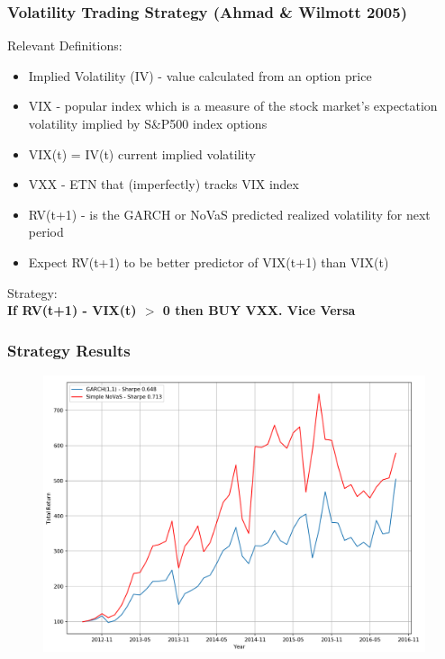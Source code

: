 \documentclass{beamer}
\begin{document}
\begin{frame}
\frametitle{Volatility Trading Strategy (Ahmad \& Wilmott 2005)}
\vspace{-2pt}
Relevant Definitions:
\begin{itemize}
\item{Implied Volatility (IV) - value calculated from an option price}
\vspace{2pt}
\item{VIX - popular index which is a measure of the stock market's expectation volatility implied by S\&P500 index options}
\vspace{2pt}
\item{VIX(t) = IV(t) current implied volatility}
\vspace{2pt}
\item{VXX - ETN that (imperfectly) tracks VIX index}
\vspace{2pt}
\item{RV(t+1) - is the GARCH or NoVaS predicted realized volatility for next period}
\vspace{2pt}
\item{Expect RV(t+1) to be better predictor of VIX(t+1) than VIX(t)}
\end{itemize}
\vspace{2pt}
Strategy:\\
\vspace{2pt}
\hspace{10pt}\textbf{If RV(t+1) - VIX(t) $>$ 0 then BUY VXX. Vice Versa}
\end{frame}

\begin{frame}
\frametitle{Strategy Results}
\begin{figure}[h!]
\includegraphics[width=\textwidth]{vol_strat.png}
\end{figure}
\end{frame}
\end{document}
